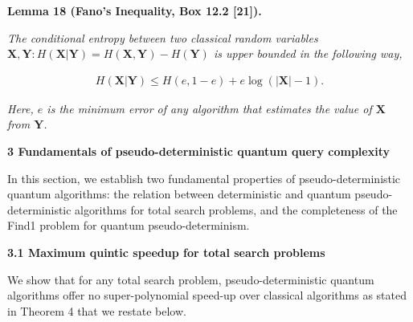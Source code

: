 \documentclass[10pt,a4paper]{article}
\begin{document}




\par\medskip\noindent\textbf{
\textbf{Lemma 18}\textbf{ }(Fano’s Inequality, Box 12.2 [21])\textbf{.}
}\par



\emph{The conditional entropy between two classical random variables $\mathbf{X},\mathbf{Y}:H(\mathbf{X}|\mathbf{Y})=H(\mathbf{X},\mathbf{Y})-H(\mathbf{Y})$ is upper bounded in the following way,}\par


\[\begin{gathered}
H(\mathbf{X}|\mathbf{Y})\leq H(e,1-e)+e\log(|\mathbf{X}|-1).
\end{gathered}\]


\emph{Here, $e$ is the minimum error of any algorithm that estimates the value of $\mathbf{X}$ from $\mathbf{Y}$.}\par








\par\medskip\noindent\textbf{
3 Fundamentals of pseudo-deterministic quantum query complexity}\par




In this section, we establish two fundamental properties of pseudo-deterministic quantum algorithms: the relation between deterministic and quantum pseudo-deterministic algorithms for total search problems, and the completeness of the Find1 problem for quantum pseudo-determinism.\par




\par\medskip\noindent\textbf{
3.1 Maximum quintic speedup for total search problems}\par




We show that for any total search problem, pseudo-deterministic quantum algorithms offer no super-polynomial speed-up over classical algorithms as stated in Theorem 4 that we restate below.\par




\end{document}
